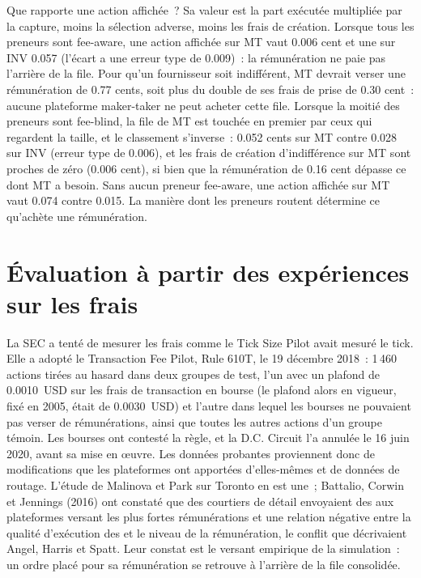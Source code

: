 Que rapporte une action affichée~? Sa valeur est la part exécutée multipliée par la capture, moins la sélection adverse, moins les frais de création. Lorsque tous les preneurs sont fee-aware, une
action affichée sur MT vaut 0.006 cent et une sur INV 0.057 (l'écart a une erreur type de 0.009)~: la rémunération ne paie pas l'arrière de la
file. Pour qu'un fournisseur soit indifférent, MT devrait verser une rémunération de 0.77 cents, soit plus du double de ses frais de prise de 0.30 cent~: aucune plateforme maker-taker ne peut
acheter cette file. Lorsque la moitié des preneurs sont fee-blind, la file de MT est touchée en premier par ceux qui regardent la taille, et le classement s'inverse~: 0.052 cents sur MT contre
0.028 sur INV (erreur type de 0.006), et les frais de création d'indifférence sur MT sont proches de zéro (0.006 cent), si bien que la rémunération de 0.16 cent dépasse ce dont MT a besoin. Sans aucun
preneur fee-aware, une action affichée sur MT vaut 0.074 contre 0.015. La manière dont les preneurs routent détermine ce qu'achète une rémunération.

\section{Évaluation à partir des expériences sur les frais}

La SEC a tenté de mesurer les frais comme le Tick Size Pilot avait mesuré le tick. Elle a adopté le Transaction Fee Pilot, Rule 610T, le 19 décembre 2018~: 1\,460
actions tirées au hasard dans deux groupes de test, l'un avec un plafond de 0.0010~USD sur les frais de transaction en bourse (le plafond alors en vigueur, fixé en 2005, était de
0.0030~USD) et l'autre dans lequel les bourses ne pouvaient pas verser de rémunérations, ainsi que toutes les autres actions d'un groupe témoin. Les bourses ont contesté la règle, et la D.C. Circuit
l'a annulée le 16 juin 2020, avant sa mise en œuvre. Les données probantes proviennent donc de modifications que les plateformes ont apportées d'elles-mêmes et de données de routage. L'étude de Malinova
et Park sur Toronto en est une~; Battalio, Corwin et Jennings (2016) ont constaté que des courtiers de détail envoyaient des  aux plateformes versant les plus fortes rémunérations
et une relation négative entre la qualité d'exécution des  et le niveau de la rémunération, le conflit que décrivaient Angel, Harris et Spatt. Leur constat est
le versant empirique de la simulation~: un ordre placé pour sa rémunération se retrouve à l'arrière de la file consolidée.

